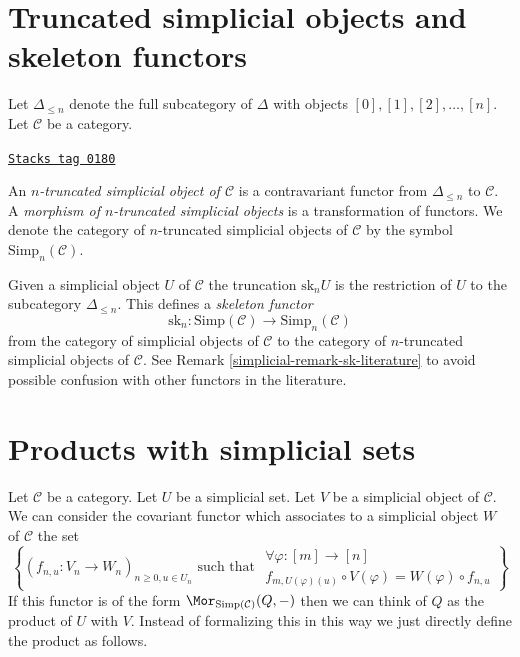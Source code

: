 \section{Truncated simplicial objects and skeleton functors}
\label{simplicial-section-skeleton}
Let $\Delta_{\leq n}$ denote the full subcategory of
$\Delta$ with objects $[0], [1], [2], \ldots, [n]$.
Let $\mathcal{C}$ be a category.

\begin{definition}
\label{simplicial-definition-truncated-simplicial-object}
\href{https://stacks.math.columbia.edu/tag/0180}{\texttt{Stacks tag 0180}}

An {\it $n$-truncated simplicial object of $\mathcal{C}$}
is a contravariant functor from $\Delta_{\leq n}$ to
$\mathcal{C}$. A {\it morphism of $n$-truncated
simplicial objects} is a transformation of functors.
We denote the category of $n$-truncated
simplicial objects of $\mathcal{C}$ by
the symbol $\text{Simp}_n(\mathcal{C})$.
\end{definition}

Given a simplicial object $U$ of $\mathcal{C}$
the truncation $\text{sk}_n U$ is the restriction
of $U$ to the subcategory $\Delta_{\leq n}$.
This defines a {\it skeleton functor}
$$
\text{sk}_n :
\text{Simp}(\mathcal{C}) \longrightarrow \text{Simp}_n(\mathcal{C})
$$
from the category of simplicial objects of $\mathcal{C}$
to the category of $n$-truncated simplicial objects of $\mathcal{C}$.
See Remark \ref{simplicial-remark-sk-literature} to avoid possible confusion
with other functors in the literature.

\section{Products with simplicial sets}
\label{simplicial-section-product-with-simplicial-sets}
Let $\mathcal{C}$ be a category.
Let $U$ be a simplicial set.
Let $V$ be a simplicial object of $\mathcal{C}$.
We can consider the covariant functor which associates
to a simplicial object $W$ of $\mathcal{C}$
the set
\begin{equation}
\label{equation-functor-product-with-simplicial-set}
\left\{
(f_{n, u} : V_n \to W_n)_{n \geq 0, u \in U_n}
\text{ such that }
\begin{matrix}
\forall \varphi : [m] \to [n] \\
f_{m, U(\varphi)(u)} \circ V(\varphi) = W(\varphi) \circ f_{n, u}
\end{matrix}
\right\}
\end{equation}
If this functor is of the form
$\Mor_{\text{Simp}(\mathcal{C})}(Q, -)$
then we can think of $Q$ as the product of $U$ with $V$.
Instead of formalizing this in this way we just directly
define the product as follows.

